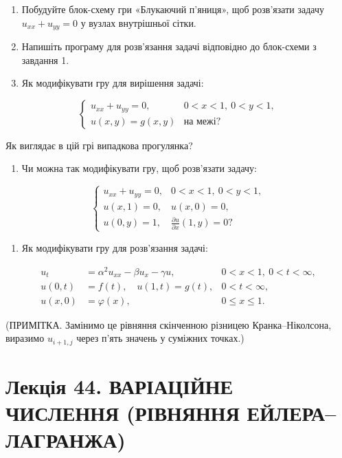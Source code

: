 \documentclass[
  ukrainian,
]{article}
\providecommand{\tightlist}{%
  \setlength{\itemsep}{0pt}\setlength{\parskip}{0pt}}
\begin{document}
\begin{enumerate}
\def\labelenumi{\arabic{enumi}.}
\item
  Побудуйте блок-схему гри «Блукаючий п'яниця», щоб розв'язати задачу
  \(u_{xx} + u_{yy} = 0\) у вузлах внутрішньої сітки.
\item
  Напишіть програму для розв'язання задачі відповідно до блок-схеми з
  завдання 1.
\item
  Як модифікувати гру для вирішення задачі:
\end{enumerate}

\[\begin{cases}u_{xx} + u_{yy} = 0, & 0 < x < 1,\ 0 < y < 1, \\u(x, y) = g(x, y) & \text{на межі?}\end{cases}\]

Як виглядає в цій грі випадкова прогулянка?

\begin{enumerate}
\def\labelenumi{\arabic{enumi}.}
\setcounter{enumi}{3}
\tightlist
\item
  Чи можна так модифікувати гру, щоб розв'язати задачу:
\end{enumerate}

\[\begin{cases}u_{xx} + u_{yy} = 0, & 0 < x < 1,\ 0 < y < 1, \\u(x, 1) = 0, & u(x, 0) = 0, \\u(0, y) = 1, & \tfrac{\partial u}{\partial x}(1, y) = 0?\end{cases}\]

\begin{enumerate}
\def\labelenumi{\arabic{enumi}.}
\setcounter{enumi}{4}
\tightlist
\item
  Як модифікувати гру для розв'язання задачі:
\end{enumerate}

\[\begin{aligned}u_t &= \alpha^2 u_{xx} - \beta u_x - \gamma u, & 0 < x < 1,\ 0 < t < \infty, \\u(0,t) &= f(t),\quad u(1,t) = g(t), & 0 < t < \infty, \\u(x,0) &= \varphi(x), & 0 \le x \le 1.\end{aligned}\]

(ПРИМІТКА. Замінимо це рівняння скінченною різницею Кранка--Ніколсона,
виразимо \(u_{i+1,j}\) через п'ять значень у суміжних точках.)

\section{Лекція 44. ВАРІАЦІЙНЕ ЧИСЛЕННЯ (РІВНЯННЯ
ЕЙЛЕРА--ЛАГРАНЖА)}\label{ux43bux435ux43aux446ux456ux44f-44.-ux432ux430ux440ux456ux430ux446ux456ux439ux43dux435-ux447ux438ux441ux43bux435ux43dux43dux44f-ux440ux456ux432ux43dux44fux43dux43dux44f-ux435ux439ux43bux435ux440ux430ux43bux430ux433ux440ux430ux43dux436ux430}
\end{document}
